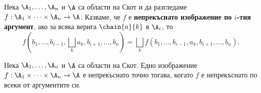
Нека $\A_1,\dots,\A_n$ и $\A$ са области на Скот и да разгледаме $f: \A_1\times \dots \times \A_n \to \A$.
Казваме, че $f$ е {\bf непрекъснато изображение по $i$-тия аргумент}, ако 
за всяка верига $\chain{a}{k}$ в $\A_i$, то
\[f(b_1,\dots, b_{i-1}, \bigsqcup_k a_k, b_{i+1},\dots,b_n) = \bigsqcup_kf(b_1,\dots, b_{i-1}, a_k, b_{i+1},\dots,b_n).\]

\begin{prop}
  Нека $\A_1,\dots,\A_n$ и $\A$ са области на Скот.
  Едно изображение $f: \A_1\times \dots \times \A_n \to \A$ 
  е непрекъснато точно тогава, когато $f$ е непрекъснато по всеки от аргументите си.
\end{prop}

